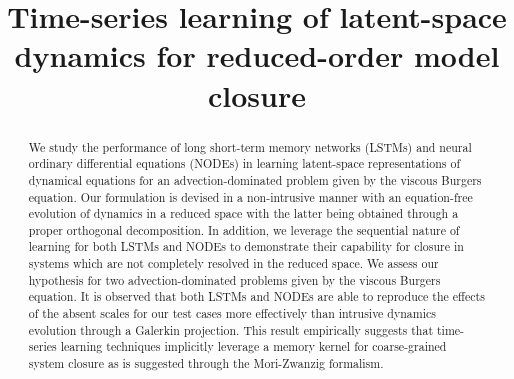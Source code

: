 \documentclass[preprint,12pt]{elsarticle}
\begin{document}
\begin{frontmatter}


\title{Time-series learning of latent-space dynamics for reduced-order model closure}







\begin{abstract}
We study the performance of long short-term memory networks (LSTMs) and neural ordinary differential equations (NODEs) in learning latent-space representations of dynamical equations for an advection-dominated problem given by the viscous Burgers equation. Our formulation is devised in a non-intrusive manner with an equation-free evolution of dynamics in a reduced space with the latter being obtained through a proper orthogonal decomposition. In addition, we leverage the sequential nature of learning for both LSTMs and NODEs to demonstrate their capability for closure in systems which are not completely resolved in the reduced space. We assess our hypothesis for two advection-dominated problems given by the viscous Burgers equation. It is observed that both LSTMs and NODEs are able to reproduce the effects of the absent scales for our test cases more effectively than intrusive dynamics evolution through a Galerkin projection. This result empirically suggests that time-series learning techniques implicitly leverage a memory kernel for coarse-grained system closure as is suggested through the Mori-Zwanzig formalism.
\end{abstract}


\end{frontmatter}
\end{document}
